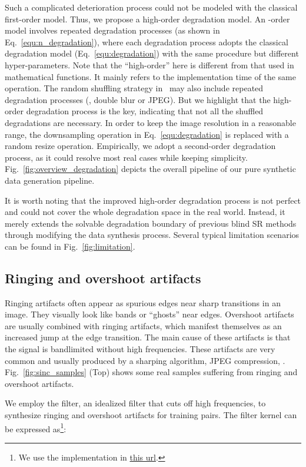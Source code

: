 \documentclass[10pt,twocolumn,letterpaper]{article}
\begin{document}
Such a complicated deterioration process could not be modeled with the classical first-order model. Thus, we propose a high-order degradation model.  An -order model involves  repeated degradation processes (as shown in Eq.~\ref{equ:n_degradation}), where each degradation process adopts the classical degradation model (Eq.~\ref{equ:degradation}) with the same procedure but different hyper-parameters.
Note that the ``high-order'' here is different from that used in mathematical functions. It mainly refers to the implementation time of the same operation.
The random shuffling strategy in~\cite{zhang2021designing} may also include repeated degradation processes (\eg, double blur or JPEG).
But we highlight that the high-order degradation process is the key, indicating that not all the shuffled degradations are necessary.
In order to keep the image resolution in a reasonable range, the downsampling operation in Eq.~\ref{equ:degradation} is replaced with a random resize operation.
Empirically, we adopt a second-order degradation process, as it could resolve most real cases while keeping simplicity.
Fig.~\ref{fig:overview_degradation} depicts the overall pipeline of our pure synthetic data generation pipeline.


It is worth noting that the improved high-order degradation process is not perfect and could not cover the whole degradation space in the real world. Instead, it merely extends the solvable degradation boundary of previous blind SR methods through modifying the data synthesis process. Several typical limitation scenarios can be found in Fig.~\ref{fig:limitation}.


\subsection{Ringing and overshoot artifacts}
Ringing artifacts often appear as spurious edges near sharp transitions in an image. They visually look like bands or ``ghosts'' near edges.
Overshoot artifacts are usually combined with ringing artifacts, which manifest themselves as an increased jump at the edge transition.
The main cause of these artifacts is that the signal is bandlimited without high frequencies.
These artifacts are very common and usually produced by a sharping algorithm, JPEG compression, \etc.
Fig.~\ref{fig:sinc_samples} (Top) shows some real samples suffering from ringing and overshoot artifacts.

We employ the  filter, an idealized filter that cuts off high frequencies, to synthesize ringing and overshoot artifacts for training pairs.
The  filter kernel can be expressed as\footnote{We use the implementation in \href{https://dsp.stackexchange.com/questions/58301/2-d-circularly-symmetric-low-pass-filter}{this url}.}:
\end{document}

